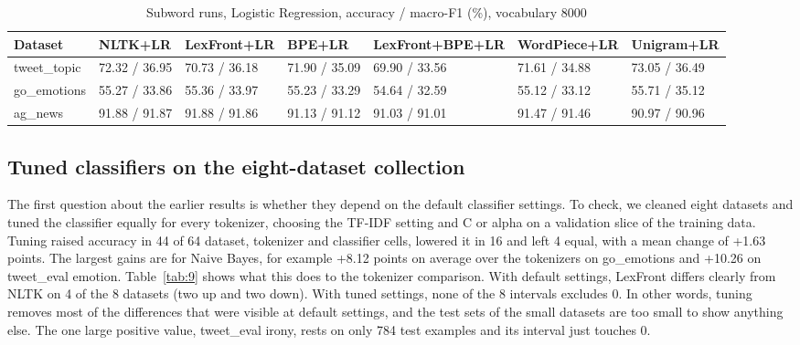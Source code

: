 \documentclass{ieeeaccess}
\begin{document}
\begin{table}[!tb]
\caption{Subword runs, Logistic Regression, accuracy / macro-F1 (\%), vocabulary 8000}\label{tab:8}
\centering
\scriptsize
\setlength{\tabcolsep}{3pt}
\begin{tabular}{lllllll}
\toprule
\textbf{Dataset} & \textbf{NLTK+LR} & \textbf{LexFront+LR} & \textbf{BPE+LR} & \textbf{LexFront+BPE+LR} & \textbf{WordPiece+LR} & \textbf{Unigram+LR} \\
\midrule
tweet\_topic & 72.32 / 36.95 & 70.73 / 36.18 & 71.90 / 35.09 & 69.90 / 33.56 & 71.61 / 34.88 & 73.05 / 36.49 \\
go\_emotions & 55.27 / 33.86 & 55.36 / 33.97 & 55.23 / 33.29 & 54.64 / 32.59 & 55.12 / 33.12 & 55.71 / 35.12 \\
ag\_news & 91.88 / 91.87 & 91.88 / 91.86 & 91.13 / 91.12 & 91.03 / 91.01 & 91.47 / 91.46 & 90.97 / 90.96 \\
\bottomrule
\end{tabular}
\end{table}

\subsection{Tuned classifiers on the eight-dataset collection}\label{sec:4.6}
The first question about the earlier results is whether they depend on the default classifier settings. To check, we cleaned eight datasets and tuned the classifier equally for every tokenizer, choosing the TF-IDF setting and C or alpha on a validation slice of the training data. Tuning raised accuracy in 44 of 64 dataset, tokenizer and classifier cells, lowered it in 16 and left 4 equal, with a mean change of +1.63 points. The largest gains are for Naive Bayes, for example +8.12 points on average over the tokenizers on go\_emotions and +10.26 on tweet\_eval emotion. Table~\ref{tab:9} shows what this does to the tokenizer comparison. With default settings, LexFront differs clearly from NLTK on 4 of the 8 datasets (two up and two down). With tuned settings, none of the 8 intervals excludes 0. In other words, tuning removes most of the differences that were visible at default settings, and the test sets of the small datasets are too small to show anything else. The one large positive value, tweet\_eval irony, rests on only 784 test examples and its interval just touches 0.
\end{document}
